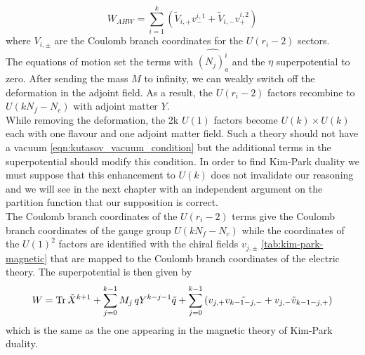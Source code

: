 \begin{equation}
W_{AHW} = \sum_{i=1}^k \left( \tilde{V}_{i,+} {v}^{i,1}_- + \tilde{V}_{i,-} {v}^{i,2}_+   \right)
\end{equation}
where $V_{i,\pm}$ are the Coulomb branch coordinates for the $U(r_i-2)$ sectors.\\
The equations of motion set the terms with $\hat{ (N_j)_a^i}$ and the $\eta$ superpotential to zero.
After sending the mass $M$ to infinity, we can weakly switch off the deformation in the adjoint field. 
As a result, the $U(r_i-2)$ factors recombine to $U(k N_f - N_c)$ with adjoint matter $Y$.\\
While removing the deformation, the 2k $U(1)$ factors become $U(k) \times U(k)$ each with one flavour and one adjoint matter field. 
Such a theory should not have a vacuum \eqref{eqn:kutasov_vacuum_condition} but the additional terms in the superpotential should modify this condition.
In order to find Kim-Park duality we must suppose that this enhancement to $U(k)$ does not invalidate our reasoning and we will see in the next chapter with an independent argument on the partition function that our supposition is correct.\\
The Coulomb branch coordinates of the $U(r_i-2)$ terms give the Coulomb branch coordinates of the gauge group $U(k N_f -N_c)$ while the coordinates of the $U(1)^2$ factors are identified with the chiral fields $v_{j,\pm}$ \eqref{tab:kim-park-magnetic} that are mapped to the Coulomb branch coordinates of the electric theory.
The superpotential is then given by
\begin{equation}
W = \mathrm{Tr } \,{\tilde{X}^{k+1}} + \sum_{j=0}^{k-1} M_j \, q Y^{k-j-1} \tilde{q} + \sum_{j=0}^{k-1} \left(  v_{j,+} \tilde{v_{k-1-j,-}} + v_{j,-} \tilde{v}_{k-1-j,+} \right)
\end{equation}
 which is the same as the one appearing in the magnetic theory of Kim-Park duality.


